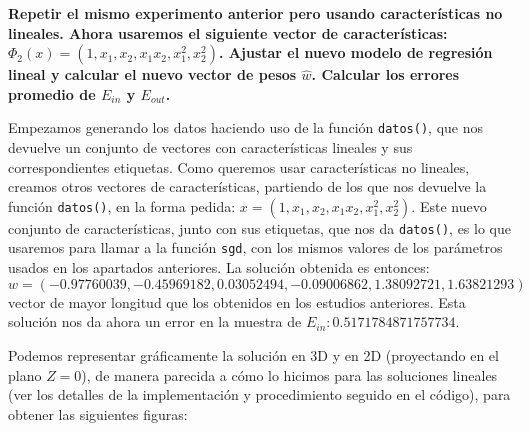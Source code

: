 \documentclass[a4]{article}
\begin{document}
\textbf{Repetir el mismo experimento anterior pero usando características no lineales. Ahora
usaremos el siguiente vector de características: $\Phi_2(x)=(1,x_1,x_2,x_1x_2,x_1^2,x_2^2)$. Ajustar el nuevo modelo de regresión lineal y calcular el nuevo vector de pesos $\hat{w}$. Calcular
los errores promedio de $E_{in}$ y $E_{out}$.
}

Empezamos generando los datos haciendo uso de la función \lstinline|datos()|, que nos devuelve un conjunto de vectores con características lineales y sus correspondientes etiquetas. Como queremos usar características no lineales, creamos otros vectores de características, partiendo de los que nos devuelve la función \lstinline|datos()|, en la forma pedida: $x=(1,x_1,x_2,x_1x_2,x_1^2,x_2^2)$. Este nuevo conjunto de características, junto con sus etiquetas, que nos da \lstinline|datos()|, es lo que usaremos para llamar a la función \lstinline|sgd|, con los mismos valores de los parámetros usados en los apartados anteriores. La solución obtenida es entonces:\\ $$w=(-0.97760039, -0.45969182,  0.03052494, -0.09006862,  1.38092721,  1.63821293)$$ vector de mayor longitud que los obtenidos en los estudios anteriores. 
Esta solución nos da ahora un error en la muestra de $E _{in}: 0.5171784871757734$.

Podemos representar gráficamente la solución en 3D y en 2D (proyectando en el plano $Z=0$), de manera parecida a cómo lo hicimos para las soluciones lineales (ver los detalles de la implementación y procedimiento seguido en el código), para obtener las siguientes figuras:
\end{document}
